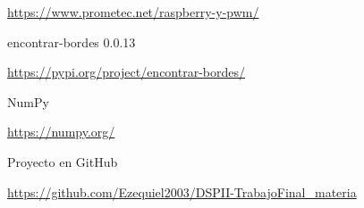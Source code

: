 \documentclass[11pt,a4paper]{article}
\begin{document}
\begin{thebibliography}{}
		\href{https://www.prometec.net/raspberry-y-pwm/}{https://www.prometec.net/raspberry-y-pwm/}
		
		 encontrar-bordes 0.0.13
		
		\href{https://pypi.org/project/encontrar-bordes/}{https://pypi.org/project/encontrar-bordes/}
		
		 NumPy
		
		\href{https://numpy.org/}{https://numpy.org/}
		
		 Proyecto en GitHub 
		
		\href{https://github.com/Ezequiel2003/DSPII-TrabajoFinal_materia}{https://github.com/Ezequiel2003/DSPII-TrabajoFinal\_materia}
		
	\end{thebibliography}
	
	
	
\end{document}
